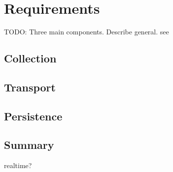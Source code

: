 \chapter{Requirements}

TODO:
Three main components. Describe general. see \cite{VanL14}

\section{Collection}

\section{Transport}

\section{Persistence}

\section{Summary}

realtime?